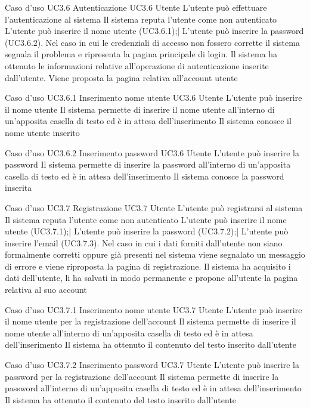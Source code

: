 \UCtitle
{Caso d'uso UC3.6}
{Autenticazione}
\UC
{UC3.6}
{Utente}
{L'utente può effettuare l'autenticazione al sistema}
{Il sistema reputa l'utente come non autenticato}
\scenario
{L'utente può inserire il nome utente (UC3.6.1);|
L'utente può inserire la password (UC3.6.2).
}
\scenarioAlt
{Nel caso in cui le credenziali di accesso non fossero corrette il sistema segnala il problema e ripresenta la pagina principale di login.
}
\post
{Il sistema ha ottenuto le informazioni relative all'operazione di autenticazione inserite dall'utente. Viene proposta la pagina relativa all'account utente}


\UCtitle
{Caso d'uso UC3.6.1}
{Inserimento nome utente}
\UC
{UC3.6}
{Utente}
{L'utente può inserire il nome utente}
{Il sistema permette di inserire il nome utente all'interno di un'apposita casella di testo ed è in attesa dell'inserimento}
\post
{Il sistema conosce il nome utente inserito}

\UCtitle
{Caso d'uso UC3.6.2}
{Inserimento password}
\UC
{UC3.6}
{Utente}
{L'utente può inserire la password}
{Il sistema permette di inserire la password all'interno di un'apposita casella di testo ed è in attesa dell'inserimento}
\post
{Il sistema conosce la password inserita}

\UCtitle
{Caso d'uso UC3.7}
{Registrazione}
\UC
{UC3.7}
{Utente}
{L'utente può registrarsi al sistema}
{Il sistema reputa l'utente come non autenticato}
\scenario
{L'utente può inserire il nome utente (UC3.7.1);|
L'utente può inserire la password (UC3.7.2);|
L'utente può inserire l'email (UC3.7.3).
}
\scenarioAlt
{Nel caso in cui i dati forniti dall'utente non siano formalmente corretti oppure già presenti nel sistema viene segnalato un messaggio di errore e viene riproposta la pagina di registrazione.
}
\post
{Il sistema ha acquisito i dati dell'utente, li ha salvati in modo permanente e propone all'utente la pagina relativa al suo account}

\UCtitle
{Caso d'uso UC3.7.1}
{Inserimento nome utente}
\UC
{UC3.7}
{Utente}
{L'utente può inserire il nome utente per la registrazione dell'account}
{Il sistema permette di inserire il nome utente all'interno di un'apposita casella di testo ed è in attesa dell'inserimento}
\post
{Il sistema ha ottenuto il contenuto del testo inserito dall'utente}

\UCtitle
{Caso d'uso UC3.7.2}
{Inserimento password}
\UC
{UC3.7}
{Utente}
{L'utente può inserire la password per la registrazione dell'account}
{Il sistema permette di inserire la password all'interno di un'apposita casella di testo ed è in attesa dell'inserimento}
\post
{Il sistema ha ottenuto il contenuto del testo inserito dall'utente}

